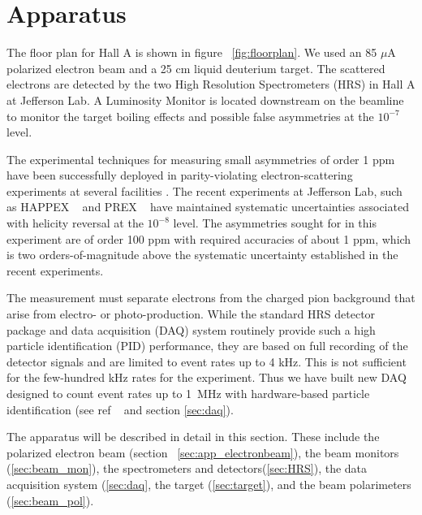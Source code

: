 
\section{Apparatus}\label{sec:apparatus}

\par 
The floor plan for Hall A is shown in figure ~\ref{fig:floorplan}.
We used an 85 $\mu$A polarized electron beam and a 25 cm liquid
deuterium target.  The scattered electrons are detected by the two
High Resolution Spectrometers (HRS) in Hall A at Jefferson Lab.
A Luminosity Monitor is located downstream on the beamline to monitor 
the target boiling effects and possible false asymmetries at the $10^{-7}$ 
level.  

The experimental techniques for measuring small 
asymmetries of order 1 ppm have been successfully deployed in
parity-violating electron-scattering experiments at several
facilities \cite{Prescott,batesc12,SAMPLEsff,HAPPEXsff,G0sff,prex}.
The recent experiments at Jefferson Lab, such as HAPPEX ~\cite{HAPPEXsff}
and PREX ~\cite{prex} have maintained systematic 
uncertainties associated with helicity
reversal at the $10^{-8}$ level.
The asymmetries sought for in this experiment are of order 100 ppm with
required accuracies of about 1 ppm, which is two orders-of-magnitude 
above the systematic uncertainty established in the recent experiments.

The measurement must separate electrons from the charged pion background 
that arise from electro- or photo-production. 
While the standard HRS detector package and data 
acquisition (DAQ) system routinely provide 
such a high particle identification (PID) performance, 
they are based on full recording 
of the detector signals and are limited to event rates up to 4 kHz.
This is not sufficient for the few-hundred kHz rates 
for the experiment. 
Thus we have built new DAQ designed to count event 
rates up to 1~MHz with hardware-based 
particle identification (see ref ~\cite{pvdis_nim} and section \ref{sec:daq}).

The apparatus will be described in detail in this section.
These include the polarized electron beam
(section ~\ref{sec:app_electronbeam}), 
the beam monitors (\ref{sec:beam_mon}),
the spectrometers and detectors(\ref{sec:HRS}), 
the data acquisition system (\ref{sec:daq}, 
the target (\ref{sec:target}),
and the beam polarimeters (\ref{sec:beam_pol}).


